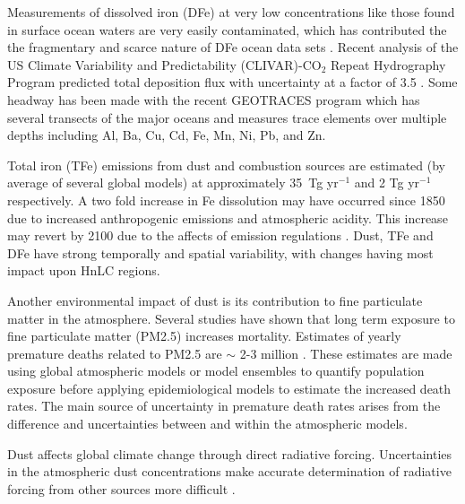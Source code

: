   Measurements of dissolved iron (DFe) at very low concentrations like those found in surface ocean waters are very easily contaminated, which has contributed the the fragmentary and scarce nature of DFe ocean data sets \citep{Rijkenberg2014}.
  Recent analysis of the US Climate Variability and Predictability (CLIVAR)-CO$_{2}$ Repeat Hydrography Program predicted total deposition flux with uncertainty at a factor of 3.5 \citep{Grand2015}.
  Some headway has been made with the recent GEOTRACES program which has several transects of the major oceans and measures trace elements over multiple depths including Al, Ba, Cu, Cd, Fe, Mn, Ni, Pb, and Zn.
    
  Total iron (TFe) emissions from dust and combustion sources are estimated (by average of several global models) at approximately 35~Tg yr$^{-1}$ and 2 Tg yr$^{-1}$ respectively. A two fold increase in Fe dissolution may have occurred since 1850 due to increased anthropogenic emissions and atmospheric acidity.
  This increase may revert by 2100 due to the affects of emission regulations \citep{Myriokefalitakis2015}.
  Dust, TFe and DFe have strong temporally and spatial variability, with changes having most impact upon HnLC regions.

  Another environmental impact of dust is its contribution to fine particulate matter in the atmosphere.
  Several studies have shown that long term exposure to fine particulate matter (PM2.5) increases mortality. 
  Estimates of yearly premature deaths related to PM2.5 are $\sim$ 2-3 million \citep{Hoek2013, Krewski2009, Silva2013, Lelieveld2015}.   
  These estimates are made using global atmospheric models or model ensembles to quantify population exposure before applying epidemiological models to estimate the increased death rates.
  The main source of uncertainty in premature death rates arises from the difference and uncertainties between and within the atmospheric models.

  Dust affects global climate change through direct radiative forcing.
  Uncertainties in the atmospheric dust concentrations make accurate determination of radiative forcing from other sources more difficult \citep{IPCC_2013_chap8}.